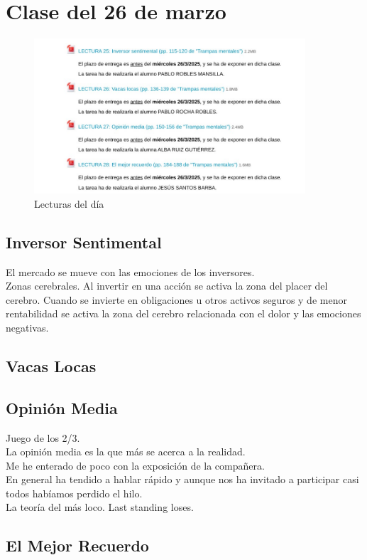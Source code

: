 \documentclass[12pt, a4paper, twoside]{article}
\begin{document}
\section{Clase del 26 de marzo}
    \begin{figure}[h]
        \centering
        \includegraphics[width=0.9\textwidth]{./Images/0326.jpg}
        \caption{Lecturas del día}
    \end{figure}

    \subsection{Inversor Sentimental}
    El mercado se mueve con las emociones de los inversores.\\
    Zonas cerebrales. Al invertir en una acción se activa la zona del placer del cerebro.
    Cuando se invierte en obligaciones u otros activos seguros y de menor rentabilidad se activa
    la zona del cerebro relacionada con el dolor y las emociones negativas.

    

    \subsection{Vacas Locas}
   
    \subsection{Opinión Media}
    Juego de los 2/3.\\
    La opinión media es la que más se acerca a la realidad.\\
    Me he enterado de poco con la exposición de la compañera.\\
    En general ha tendido a hablar rápido y aunque nos ha invitado a participar casi todos habíamos perdido el hilo.\\
    La teoría del más loco. Last standing loses.\\
    


    \subsection{El Mejor Recuerdo}
\end{document}

